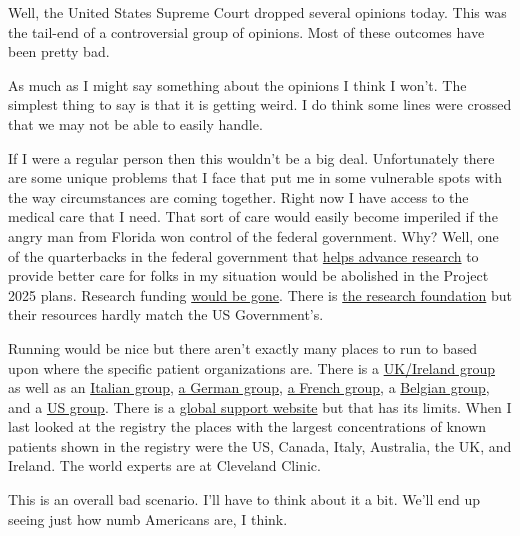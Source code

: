 Well, the United States Supreme Court dropped several opinions today.
This was the tail-end of a controversial group of opinions. Most of
these outcomes have been pretty bad.

As much as I might say something about the opinions I think I won't. The
simplest thing to say is that it is getting weird. I do think some lines
were crossed that we may not be able to easily handle.

If I were a regular person then this wouldn't be a big deal.
Unfortunately there are some unique problems that I face that put me in
some vulnerable spots with the way circumstances are coming together.
Right now I have access to the medical care that I need. That sort of
care would easily become imperiled if the angry man from Florida won
control of the federal government. Why? Well, one of the quarterbacks in
the federal government that
\href{https://ncats.nih.gov/research/research-activities?related_office\%5B\%5D=2\#research-activities-at-NCATS}{helps
advance research} to provide better care for folks in my situation would
be abolished in the Project 2025 plans. Research funding
\href{https://ncats.nih.gov/research/research-activities/rdcrn}{would be
gone}. There is \href{https://www.ptenresearch.org}{the research
foundation} but their resources hardly match the US Government's.

Running would be nice but there aren't exactly many places to run to
based upon where the specific patient organizations are. There is a
\href{https://ptenuki.org/}{UK/Ireland group} as well as an
\href{https://www.ptenitalia.org/}{Italian group},
\href{https://www.shg-cobald.de/}{a German group},
\href{https://www.syndromedecowden.com/}{a French group}, a
\href{https://ptenbelgienederland.nl/}{Belgian group}, and a
\href{https://ptenfoundation.org/}{US group}. There is a
\href{https://www.ptenworld.com/pten-world}{global support website} but
that has its limits. When I last looked at the registry the places with
the largest concentrations of known patients shown in the registry were
the US, Canada, Italy, Australia, the UK, and Ireland. The world experts
are at Cleveland Clinic.

This is an overall bad scenario. I'll have to think about it a bit.
We'll end up seeing just how numb Americans are, I think.
